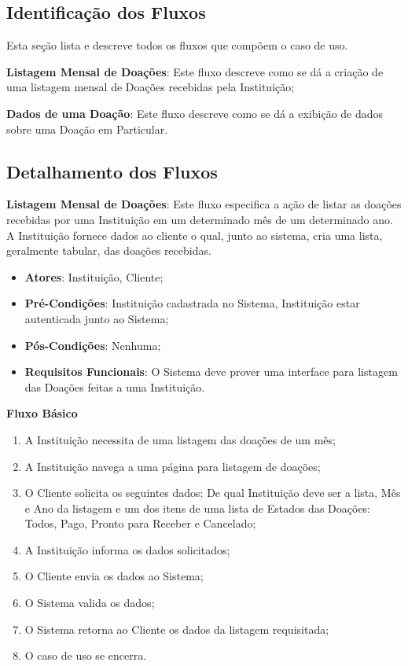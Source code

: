 \begin{anexosenv}
\subsection*{Identificação dos Fluxos}
Esta seção lista e descreve todos os fluxos que compõem o caso de uso.
\begin{lista}
  \item \textbf{Listagem Mensal de Doações}: Este fluxo descreve como se dá a criação de uma listagem mensal de Doações recebidas pela Instituição;
  \item \textbf{Dados de uma Doação}: Este fluxo descreve como se dá a exibição de dados sobre uma Doação em Particular.
\end{lista}

\subsection*{Detalhamento dos Fluxos}
\begin{lista}
  \item \textbf{Listagem Mensal de Doações}: Este fluxo especifica a ação de listar as doações recebidas por uma Instituição em um determinado mês de um determinado ano. A Instituição fornece dados ao cliente o qual, junto ao sistema, cria uma lista, geralmente tabular, das doações recebidas.
    \begin{itemize}
    \item \textbf{Atores}: Instituição, Cliente;
    \item \textbf{Pré-Condições}: Instituição cadastrada no Sistema, Instituição estar autenticada junto ao Sistema;
    \item \textbf{Pós-Condições}: Nenhuma;
    \item \textbf{Requisitos Funcionais}: O Sistema deve prover uma interface para listagem das Doações feitas a uma Instituição.
    \end{itemize}
	
    \textbf{Fluxo Básico}
    \begin{enumerate}
    \item A Instituição necessita de uma listagem das doações de um mês;
    \item A Instituição navega a uma página para listagem de doações;
    \item O Cliente solicita os seguintes dados: De qual Instituição deve ser a lista, Mês e Ano da listagem e um dos itens de uma lista de Estados das Doações: Todos, Pago, Pronto para Receber e Cancelado;
    \item A Instituição informa os dados solicitados;
    \item O Cliente envia os dados ao Sistema;
    \item O Sistema valida os dados;
    \item O Sistema retorna ao Cliente os dados da listagem requisitada;
    \item O caso de uso se encerra.
    \end{enumerate}
    

\end{lista}
\end{anexosenv}

